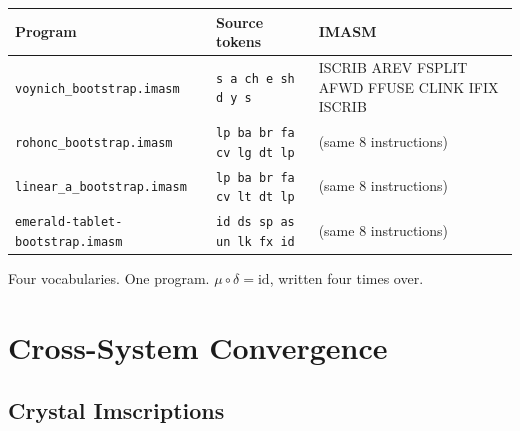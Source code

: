 \documentclass[12pt,a4paper]{article}
\begin{document}
\begin{center}
\small
\begin{tabular}{lll}
\toprule
Program & Source tokens & IMASM \\
\midrule
\texttt{voynich\_bootstrap.imasm}          & \texttt{s a ch e sh d y s} & ISCRIB AREV FSPLIT AFWD FFUSE CLINK IFIX ISCRIB \\
\texttt{rohonc\_bootstrap.imasm}           & \texttt{lp ba br fa cv lg dt lp} & (same 8 instructions) \\
\texttt{linear\_a\_bootstrap.imasm}        & \texttt{lp ba br fa cv lt dt lp} & (same 8 instructions) \\
\texttt{emerald-tablet-bootstrap.imasm}    & \texttt{id ds sp as un lk fx id} & (same 8 instructions) \\
\bottomrule
\end{tabular}
\end{center}

Four vocabularies. One program. $\mu \circ \delta = \mathrm{id}$, written four times over.

\section{Cross-System Convergence}
\label{sec:convergence}

\subsection{Crystal Imscriptions}
\end{document}
